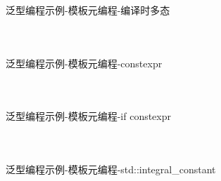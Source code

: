 \documentclass[UTF8,aspectratio=169]{beamer}
\begin{document}
\begin{frame}[fragile]{泛型编程示例-模板元编程-编译时多态}
    \begin{columns}
        \begin{column}{0.48\textwidth}
            \inputminted[firstline=1,lastline=18]{cpp}{code/gp_template_metaprogramming_6.cpp}
        \end{column}
        \begin{column}{0.48\textwidth}
            \inputminted[firstline=20,lastline=32]{cpp}{code/gp_template_metaprogramming_6.cpp}
        \end{column}
    \end{columns}
\end{frame}

\begin{frame}[fragile]{泛型编程示例-模板元编程-constexpr}
    \begin{columns}
        \begin{column}{0.48\textwidth}
            \inputminted[firstline=1,lastline=16]{cpp}{code/gp_template_metaprogramming_7.cpp}
        \end{column}
        \begin{column}{0.48\textwidth}
            \inputminted[firstline=18,lastline=36]{cpp}{code/gp_template_metaprogramming_7.cpp}
        \end{column}
    \end{columns}
\end{frame}

\begin{frame}[fragile]{泛型编程示例-模板元编程-if constexpr}
    \begin{columns}
        \begin{column}{0.48\textwidth}
            \inputminted[firstline=1,lastline=15]{cpp}{code/gp_template_metaprogramming_8.cpp}
        \end{column}
        \begin{column}{0.48\textwidth}
            \inputminted[firstline=16,lastline=35]{cpp}{code/gp_template_metaprogramming_8.cpp}
        \end{column}
    \end{columns}
\end{frame}

\begin{frame}[fragile]{泛型编程示例-模板元编程-std::integral\_constant}
    \begin{columns}
        \begin{column}{0.48\textwidth}
            \inputminted[firstline=1,lastline=16]{cpp}{code/gp_template_metaprogramming_9.cpp}
        \end{column}
        \begin{column}{0.48\textwidth}
            \inputminted[firstline=17,lastline=32]{cpp}{code/gp_template_metaprogramming_9.cpp}
        \end{column}
    \end{columns}
\end{frame}
\end{document}
